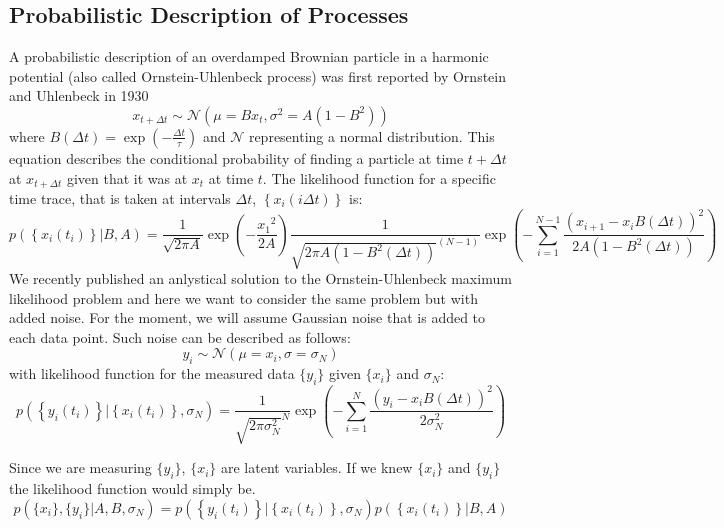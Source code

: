\documentclass[%
 reprint,
 amsmath,amssymb,
 aps,
]{revtex4-1}
\begin{document}
\subsection{Probabilistic Description of Processes}
A probabilistic description of an overdamped Brownian particle in a harmonic potential (also called Ornstein-Uhlenbeck process) was first reported by Ornstein and Uhlenbeck in 1930 \cite{RN28}
\begin{equation}\label{OUp}
	x_{t+\Delta t} \sim \mathcal{N}(\mu=Bx_{t},\sigma^{2}=A(1-B^{2}))
\end{equation}
where $B(\Delta t) = \exp \left( { - \frac{\Delta t}{\tau}} \right)$ and $\mathcal{N}$ representing a normal distribution.
This equation describes the conditional probability of finding a particle at time $t+\Delta t$ at $x_{t+\Delta t}$ given that it was at $x_{t}$ at time $t$.  The likelihood function for a specific time trace, that is taken at intervals $\Delta t$, $\left\{x_i(i\Delta t)\right\}$ is:
\begin{equation}
	p\left( \left\{x_i(t_i)\right\} \left| B, A \right.\right) =
	\frac{1}{\sqrt {2 \pi A} }
	\exp \left( { - \frac{{x_1}^2}{2A}}\right)
	\frac{1}{{\sqrt {2\pi A(1-B^{2}(\Delta t))}^{(N-1)} }}
	\exp \left( { - \sum\limits_{i=1}^{N-1}\frac{{{{\left( {x_{i+1} - {x_i}B(\Delta t)} \right)}^2}}}{{2A(1-B^{2}(\Delta t))}}} \right)
\end{equation}
We recently published an anlystical solution to the Ornstein-Uhlenbeck maximum likelihood problem \cite{RN91} and here we want to consider the same problem but with added noise.  For the moment, we will assume Gaussian noise that is added to each data point.  Such noise can be described as follows:
\begin{equation}
	y_{i} \sim \mathcal{N}(\mu=x_{i},\sigma=\sigma_{N})
\end{equation}
with likelihood function for the measured data $\{y_{i}\}$ given $\{x_{i}\}$ and $\sigma_{N}$:
\begin{equation}
	p\left( \left\{y_i(t_i)\right\} \left| \left\{x_i(t_i)\right\},\sigma_{N} \right.\right) =
	\frac{1}{{\sqrt {2\pi \sigma_{N}^{2}}^{N} }}
	\exp \left( { - \sum\limits_{i=1}^{N}\frac{{{{\left( {y_{i} - x_{i}B(\Delta t)} \right)}^2}}}{{2\sigma_{N}^{2}}}} \right)
\end{equation}

Since we are measuring $\{y_{i}\}$, $\{x_{i}\}$ are latent variables.  If we knew $\{x_{i}\}$ and $\{y_{i}\}$ the likelihood function would simply be.
\begin{equation}
	p\left( \{x_{i}\},\{y_{i}\}|A,B,\sigma_{N}\right) = 
	p\left( \left\{y_i(t_i)\right\} \left| \left\{x_i(t_i)\right\},\sigma_{N} \right.\right)
	p\left( \left\{x_i(t_i)\right\} \left| B, A \right.\right)
\end{equation}
\end{document}
